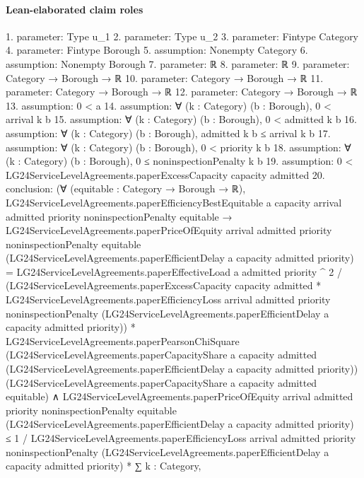 \documentclass[10pt]{article}
\begin{document}
\paragraph{Lean-elaborated claim roles}\begin{ReviewVerbatim}
1. parameter: Type u_1
2. parameter: Type u_2
3. parameter: Fintype Category
4. parameter: Fintype Borough
5. assumption: Nonempty Category
6. assumption: Nonempty Borough
7. parameter: ℝ
8. parameter: ℝ
9. parameter: Category → Borough → ℝ
10. parameter: Category → Borough → ℝ
11. parameter: Category → Borough → ℝ
12. parameter: Category → Borough → ℝ
13. assumption: 0 < a
14. assumption: ∀ (k : Category) (b : Borough), 0 < arrival k b
15. assumption: ∀ (k : Category) (b : Borough), 0 < admitted k b
16. assumption: ∀ (k : Category) (b : Borough), admitted k b ≤ arrival k b
17. assumption: ∀ (k : Category) (b : Borough), 0 < priority k b
18. assumption: ∀ (k : Category) (b : Borough), 0 ≤ noninspectionPenalty k b
19. assumption: 0 < LG24ServiceLevelAgreements.paperExcessCapacity capacity admitted
20. conclusion: (∀ (equitable : Category → Borough → ℝ),
    LG24ServiceLevelAgreements.paperEfficiencyBestEquitable a capacity arrival admitted priority noninspectionPenalty
        equitable →
      LG24ServiceLevelAgreements.paperPriceOfEquity arrival admitted priority noninspectionPenalty equitable
            (LG24ServiceLevelAgreements.paperEfficientDelay a capacity admitted priority) =
          LG24ServiceLevelAgreements.paperEffectiveLoad a admitted priority ^ 2 /
              (LG24ServiceLevelAgreements.paperExcessCapacity capacity admitted *
                LG24ServiceLevelAgreements.paperEfficiencyLoss arrival admitted priority noninspectionPenalty
                  (LG24ServiceLevelAgreements.paperEfficientDelay a capacity admitted priority)) *
            LG24ServiceLevelAgreements.paperPearsonChiSquare
              (LG24ServiceLevelAgreements.paperCapacityShare a capacity admitted
                (LG24ServiceLevelAgreements.paperEfficientDelay a capacity admitted priority))
              (LG24ServiceLevelAgreements.paperCapacityShare a capacity admitted equitable) ∧
        LG24ServiceLevelAgreements.paperPriceOfEquity arrival admitted priority noninspectionPenalty equitable
              (LG24ServiceLevelAgreements.paperEfficientDelay a capacity admitted priority) ≤
            1 /
                LG24ServiceLevelAgreements.paperEfficiencyLoss arrival admitted priority noninspectionPenalty
                  (LG24ServiceLevelAgreements.paperEfficientDelay a capacity admitted priority) *
              ∑ k : Category,

\end{ReviewVerbatim}
\end{document}
